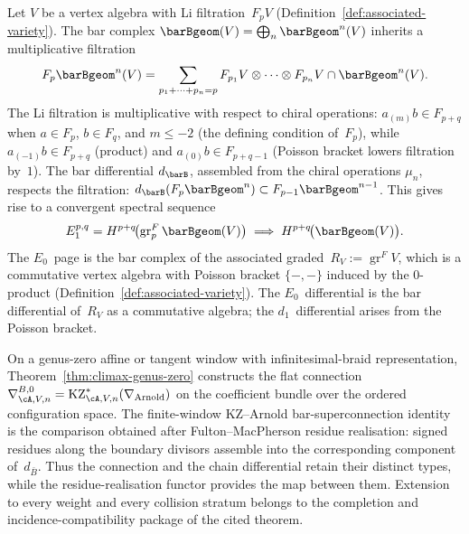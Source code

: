 \begin{construction}
\label{constr:li-bar-spectral-sequence}
Let $V$ be a vertex algebra with Li filtration~$F_p V$
(Definition~\ref{def:associated-variety}). The bar complex
$\barBgeom(V) = \bigoplus_n \barBgeom^n(V)$ inherits a
multiplicative filtration
\[
F_p \barBgeom^n(V)
= \sum_{p_1 + \cdots + p_n = p}
 F_{p_1} V \otimes \cdots \otimes F_{p_n} V
 \cap \barBgeom^n(V).
\]
The Li filtration is multiplicative with respect to chiral
operations: $a_{(m)} b \in F_{p+q}$ when $a \in F_p$,
$b \in F_q$, and $m \leq -2$ (the defining condition
of~$F_p$), while $a_{(-1)} b \in F_{p+q}$ (product) and
$a_{(0)} b \in F_{p+q-1}$ (Poisson bracket lowers filtration
by~$1$). The bar differential $d_{\barB}$, assembled from
the chiral operations $\mu_n$, respects the filtration:
$d_{\barB}(F_p \barBgeom^n) \subset F_{p-1} \barBgeom^{n-1}$.
This gives rise to a convergent spectral sequence
\begin{equation}\label{eq:li-bar-ss}
E_1^{p,q}
= H^{p+q}\!\bigl(\operatorname{gr}^F_p \barBgeom(V)\bigr)
\;\Longrightarrow\;
H^{p+q}\!\bigl(\barBgeom(V)\bigr).
\end{equation}
The $E_0$~page is the bar complex of the associated
graded~$R_V := \operatorname{gr}^F V$, which is a commutative
vertex algebra with Poisson bracket $\{-,-\}$ induced by the
$0$-product (Definition~\ref{def:associated-variety}).
The $E_0$~differential is the bar differential of~$R_V$ as a
commutative algebra; the $d_1$~differential arises from the
Poisson bracket.
\end{construction}

\begin{remark}
\label{rem:ckp-kz-arnold-residue-realization}
On a genus-zero affine or tangent window with infinitesimal-braid
representation, Theorem~\ref{thm:climax-genus-zero} constructs the
flat connection
\(
 \nabla^{B,0}_{\cA,V,n}
 =\mathrm{KZ}_{\cA,V,n}^{*}(\nabla_{\mathrm{Arnold}})
\)
on the coefficient bundle over the ordered configuration space.  The
finite-window KZ--Arnold bar-superconnection identity is the comparison
obtained after Fulton--MacPherson residue realisation: signed residues
along the boundary divisors assemble into the corresponding component
of~\(d_{\bar B}\).  Thus the connection and the chain differential
retain their distinct types, while the residue-realisation functor
provides the map between them.  Extension to every weight and every
collision stratum belongs to the completion and incidence-compatibility
package of the cited theorem.
\end{remark}

